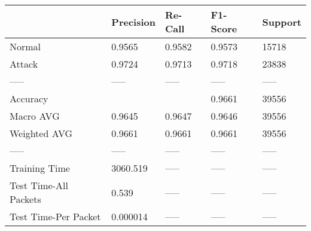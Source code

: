\begin{tabular}{lllll}
\toprule
{} & Precision & Re-Call & F1-Score & Support \\
\midrule
Normal                &    0.9565 &  0.9582 &   0.9573 &   15718 \\
Attack                &    0.9724 &  0.9713 &   0.9718 &   23838 \\
-----                 &     ----- &   ----- &    ----- &   ----- \\
Accuracy              &           &         &   0.9661 &   39556 \\
Macro AVG             &    0.9645 &  0.9647 &   0.9646 &   39556 \\
Weighted AVG          &    0.9661 &  0.9661 &   0.9661 &   39556 \\
-----                 &     ----- &   ----- &    ----- &   ----- \\
Training Time         &  3060.519 &   ----- &    ----- &   ----- \\
Test Time-All Packets &     0.539 &   ----- &    ----- &   ----- \\
Test Time-Per Packet  &  0.000014 &   ----- &    ----- &   ----- \\
\bottomrule
\end{tabular}
